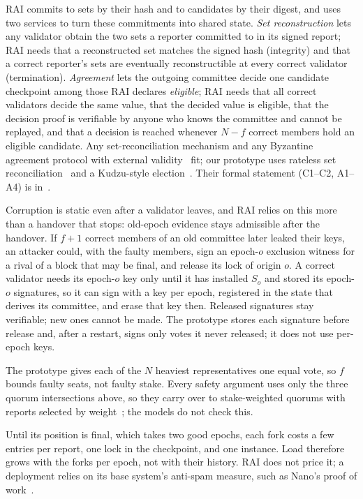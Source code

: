 RAI commits to sets by their hash and to candidates by their digest, and uses two services to turn these commitments into shared state. \emph{Set reconstruction} lets any validator obtain the two sets a reporter committed to in its signed report; RAI needs that a reconstructed set matches the signed hash (integrity) and that a correct reporter's sets are eventually reconstructible at every correct validator (termination). \emph{Agreement} lets the outgoing committee decide one candidate checkpoint among those RAI declares \emph{eligible}; RAI needs that all correct validators decide the same value, that the decided value is eligible, that the decision proof is verifiable by anyone who knows the committee and cannot be replayed, and that a decision is reached whenever $N-f$ correct members hold an eligible candidate. Any set-reconciliation mechanism and any Byzantine agreement protocol with external validity~\cite{externalvalidity} fit; our prototype uses rateless set reconciliation~\cite{rateless} and a Kudzu-style election~\cite{kudzu}. Their formal statement (C1--C2, A1--A4) is in~\cite{extended}.

Corruption is static even after a validator leaves, and RAI relies on this more than a handover that stops: old-epoch evidence stays admissible after the handover. If $f+1$ correct members of an old committee later leaked their keys, an attacker could, with the faulty members, sign an epoch-$o$ exclusion witness for a rival of a block that may be final, and release its lock of origin $o$. A correct validator needs its epoch-$o$ key only until it has installed $S_o$ and stored its epoch-$o$ signatures, so it can sign with a key per epoch, registered in the state that derives its committee, and erase that key then. Released signatures stay verifiable; new ones cannot be made. The prototype stores each signature before release and, after a restart, signs only votes it never released; it does not use per-epoch keys.

The prototype gives each of the $N$ heaviest representatives one equal vote, so $f$ bounds faulty seats, not faulty stake. Every safety argument uses only the three quorum intersections above, so they carry over to stake-weighted quorums with reports selected by weight~\cite{extended}; the models do not check this.

Until its position is final, which takes two good epochs, each fork costs a few entries per report, one lock in the checkpoint, and one instance. Load therefore grows with the forks per epoch, not with their history. RAI does not price it; a deployment relies on its base system's anti-spam measure, such as Nano's proof of work~\cite{nano}.

